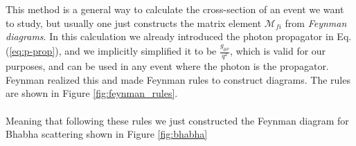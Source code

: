 \documentclass[12pt, a4paper]{book}
\begin{document}
This method is a general way to calculate the cross-section of an event we want to study, but usually one just constructs the matrix element $\mathcal{M}_{fi}$ from \textit{Feynman diagrams}. In this calculation we 
already introduced the photon propagator in Eq. (\ref{eq:p-prop}), and we implicitly simplified it to be $\frac{g_{\mu\nu}}{q^2}$, which is valid for our purposes, and can be used in any event where the photon is the propagator. 
Feynman realized this and made Feynman rules to construct diagrams. The rules are shown in Figure \ref{fig:feynman_rules}. \\
\\Meaning that following these rules we just constructed the Feynman diagram for Bhabha scattering shown in Figure \ref{fig:bhabha}
\begin{figure}[!ht]
    \centering
    \begin{tikzpicture}[x=0.75pt,y=0.75pt,yscale=-1,xscale=1]
        

\end{tikzpicture}
\end{figure}
\end{document}
